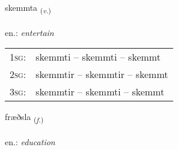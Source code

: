\documentclass[frontgrid, backgrid]{flacards}\usepackage[]{graphicx}\usepackage[]{xcolor}
\begin{document}
\renewcommand{\flhead}{\vskip5pt \fboxsep=0pt {\small\bfseries\footnotesize Sagnorð | Verb}}
\renewcommand{\fcfoot}{\vskip5pt \fboxsep=0pt \hspace{2pt}{\small\bfseries\footnotesize 2K}}

\renewcommand{\blhead}{\vskip5pt {\small\bfseries\footnotesize Sagnorð | Verb }}
\renewcommand{\bcfoot}{\vskip5pt \hspace{2pt}{\small\bfseries\footnotesize 2K}}


{skemmta \small{\textsubscript{(\textit{v.})}} \\[1ex] %
\textphonetic{[scɛm̥ta]} \\
en.: \emph{entertain} \\  [2ex]
\renewcommand*{\arraystretch}{0.8}
\begin{tabular}{p{1cm}l}
\textsc{1sg}: & skemmti -- skemmti -- skemmt \\ 
\textsc{2sg}: & skemmtir -- skemmtir -- skemmt \\ 
\textsc{3sg}: & skemmtir -- skemmti -- skemmt \\ 
\end{tabular}
}

\renewcommand{\flhead}{\vskip5pt \fboxsep=0pt {\small\bfseries\footnotesize Nafnorð | Noun}}
\renewcommand{\fcfoot}{\vskip5pt \fboxsep=0pt \hspace{2pt}{\small\bfseries\footnotesize 2K}}

\renewcommand{\blhead}{\vskip5pt {\small\bfseries\footnotesize Nafnorð | Noun }}
\renewcommand{\bcfoot}{\vskip5pt \hspace{2pt}{\small\bfseries\footnotesize 2K}}


{fræðsla \small{\textsubscript{(\textit{f.})}} \\[1ex] %
\textphonetic{[fraiðstla]} \\
en.: \emph{education} \\  [2ex]
\renewcommand*{\arraystretch}{0.8}
}
\end{document}
